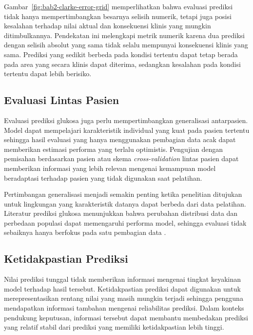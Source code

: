 Gambar~\ref{fig:bab2-clarke-error-grid} memperlihatkan bahwa evaluasi prediksi tidak hanya mempertimbangkan besarnya selisih numerik, tetapi juga posisi kesalahan terhadap nilai 
aktual dan konsekuensi klinis yang mungkin ditimbulkannya. Pendekatan ini melengkapi metrik numerik karena dua prediksi dengan selisih absolut yang sama tidak selalu mempunyai konsekuensi 
klinis yang sama. Prediksi yang sedikit berbeda pada kondisi tertentu dapat tetap berada pada area yang secara klinis dapat diterima, sedangkan kesalahan pada kondisi tertentu dapat 
lebih berisiko.

\subsection{Evaluasi Lintas Pasien}
\label{subsec:bab2-evaluasi-lintas-pasien}

Evaluasi prediksi glukosa juga perlu mempertimbangkan generalisasi antarpasien. Model dapat mempelajari karakteristik individual yang kuat pada pasien tertentu sehingga hasil 
evaluasi yang hanya menggunakan pembagian data acak dapat memberikan estimasi performa yang terlalu optimistis. Pengujian dengan pemisahan berdasarkan pasien atau skema \textit{cross-validation} 
lintas pasien dapat memberikan informasi yang lebih relevan mengenai kemampuan model beradaptasi terhadap pasien yang tidak digunakan saat pelatihan.

Pertimbangan generalisasi menjadi semakin penting ketika penelitian ditujukan untuk lingkungan yang karakteristik datanya dapat berbeda dari data pelatihan. Literatur prediksi 
glukosa menunjukkan bahwa perubahan distribusi data dan perbedaan populasi dapat memengaruhi performa model, sehingga evaluasi tidak sebaiknya hanya berfokus pada satu 
pembagian data \parencite{ghimire2024}.

\subsection{Ketidakpastian Prediksi}
\label{subsec:bab2-ketidakpastian-prediksi}

Nilai prediksi tunggal tidak memberikan informasi mengenai tingkat keyakinan model terhadap hasil tersebut. Ketidakpastian prediksi dapat digunakan untuk merepresentasikan 
rentang nilai yang masih mungkin terjadi sehingga pengguna mendapatkan informasi tambahan mengenai reliabilitas prediksi. Dalam konteks pendukung keputusan, informasi tersebut 
dapat membantu membedakan prediksi yang relatif stabil dari prediksi yang memiliki ketidakpastian lebih tinggi.

